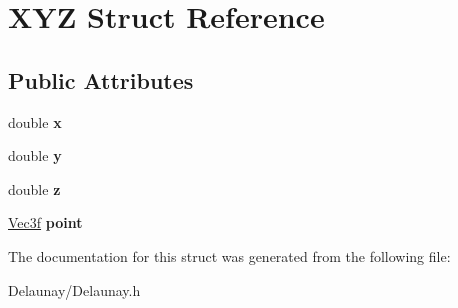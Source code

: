 \hypertarget{struct_x_y_z}{}\section{X\+YZ Struct Reference}
\label{struct_x_y_z}
\subsection*{Public Attributes}
\begin{DoxyCompactItemize}
\item 
\mbox{\label{struct_x_y_z_a1f7f446eb3411e219da902419417c907}} 
double {\bfseries x}
\item 
\mbox{\label{struct_x_y_z_ab3baa989a1b53304bc8a0b0a8d4afe61}} 
double {\bfseries y}
\item 
\mbox{\label{struct_x_y_z_a7a0a36dd9c757dcfde7559d66992d905}} 
double {\bfseries z}
\item 
\mbox{\label{struct_x_y_z_a63ae49bcdc6c69fb79b2a00a4ebbd4ca}} 
\hyperlink{struct_vec3f}{Vec3f} {\bfseries point}
\end{DoxyCompactItemize}


The documentation for this struct was generated from the following file\+:\begin{DoxyCompactItemize}
\item 
Delaunay/Delaunay.\+h\end{DoxyCompactItemize}
